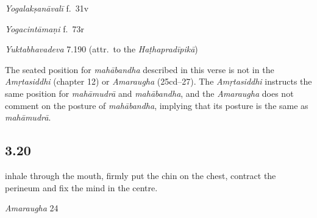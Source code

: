 \begin{ekdosis}
\begin{testimonia}[hp03_019]
\emph{Yogalakṣanāvalī} f.~31v
\begin{versinnote}
\end{versinnote}

\emph{Yogacintāmaṇi} f.~73r
\begin{versinnote}
\end{versinnote}

\emph{Yuktabhavadeva} 7.190 (attr.~to the \emph{Haṭhapradīpikā})
\begin{versinnote}
\end{versinnote}
\end{testimonia}

\begin{philcomm}[hp03_019]
The seated position for \emph{mahābandha} described in this verse is not in the \emph{Amṛtasiddhi} (chapter 12) or \emph{Amaraugha} (25cd–27). The \emph{Amṛtasiddhi} instructs the same position for \emph{mahāmudrā} and \emph{mahābandha}, and the \emph{Amaraugha} does not comment on the posture of \emph{mahābandha}, implying that its posture is the same as \emph{mahāmudrā}.
\end{philcomm}

\subsection*{3.20}
\begin{translation}[hp03_020]
[\dots] inhale through the mouth, firmly put the chin on the chest, contract the perineum and fix the mind in the centre.
\end{translation}

\begin{sources}[hp03_020]
\emph{Amaraugha} 24
\begin{versinnote}
\tl{\var{nibhṛtya ] nibhṛtaṃ \vl}\\!}
\end{versinnote}
\end{sources}


\end{ekdosis}
